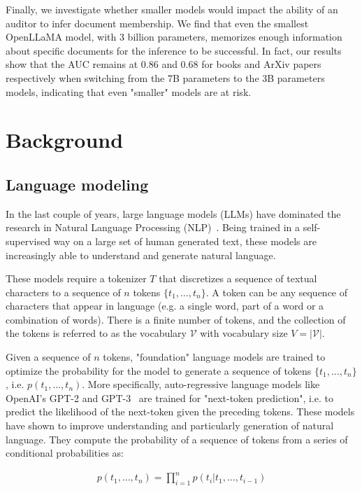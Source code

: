 \documentclass[twocolumn,10pt]{article}
\begin{document}
Finally, we investigate whether smaller models would impact the ability of an auditor to infer document membership. We find that even the smallest OpenLLaMA model, with 3 billion parameters, memorizes enough information about specific documents for the inference to be successful. In fact, our results show that the AUC remains at 0.86 and 0.68 for books and ArXiv papers respectively when switching from the 7B parameters to the 3B parameters models, indicating that even "smaller" models are at risk. 

 

\section{Background}

\subsection{Language modeling}

In the last couple of years, large language models (LLMs) have dominated the research in Natural Language Processing (NLP)~\cite{radford2019language,brown2020language,vaswani2017attention}. Being trained in a self-supervised way on a large set of human generated text, these models are increasingly able to understand and generate natural language.

These models require a tokenizer $T$ that discretizes a sequence of textual characters to a sequence of $n$ tokens $\{t_1,\ldots,t_n\}$. A token can be any sequence of characters that appear in language (e.g. a single word, part of a word or a combination of words). There is a finite number of tokens, and the collection of the tokens is referred to as the vocabulary $\mathcal{V}$ with vocabulary size $V =|\mathcal{V}|$.

Given a sequence of $n$ tokens, "foundation" language models are trained to optimize the probability for the model to generate a sequence of tokens $\{t_1,\ldots,t_n\}$, i.e. $p(t_{1},\ldots,t_{n})$. 
More specifically, auto-regressive language models like OpenAI's GPT-2 and GPT-3~\cite{radford2019language,brown2020language} are trained for "next-token prediction", i.e. to predict the likelihood of the next-token given the preceding tokens. These models have shown to improve understanding and particularly generation of natural language. They compute the probability of a sequence of tokens from a series of conditional probabilities as:

\begin{align}
    p(t_{1},\ldots,t_{n}) = \prod_{i=1}^{n} p(t_i | t_1,\ldots,t_{i-1})
\end{align}
\end{document}
